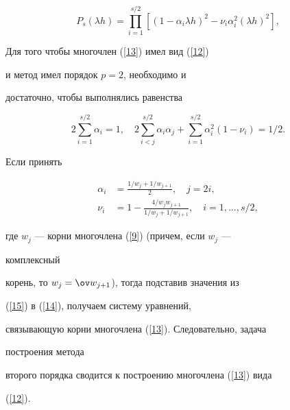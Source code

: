\begin{equation}


P_s(\lambda h)=\prod^{s/2}_{i=1}[(1-\alpha_{i}\lambda h)^2-


\nu_{i}\alpha^2_{i}(\lambda h)^2],


\label{13}


\end{equation}


Для того чтобы многочлен (\ref{13}) имел вид (\ref{12})


и метод имел порядок $p=2$, необходимо и


достаточно, чтобы выполнялись равенства


\begin{equation}


2\sum_{i=1}^{s/2}\alpha_i =1, \quad


2\sum_{i<j}^{s/2}\alpha_i\alpha_j+


\sum_{i=1}^{s/2}\alpha^2_i(1-\nu_i) = 1/2.


\label{14}


\end{equation}


Если принять


\begin{equation}


\begin{split}


\alpha_i & = \frac{1/w_j+1/w_{j+1}}{2}, \quad j=2i,\\


\nu_i &= 1-\frac{4/w_j w_{j+1}}{1/w_j +1/w_{j+1}},\quad i=1,\dotsc,s/2,


\end{split}


\label{15}


\end{equation}


где $w_j$ --- корни многочлена (\ref{9}) (причем, если $w_j$ ---


комплексный


корень, то $w_j =\ov w_{j+1}$), тогда подставив значения из


(\ref{15}) в (\ref{14}), получаем систему уравнений,


связывающую корни многочлена (\ref{13}). Следовательно, задача


построения метода


второго порядка сводится к построению многочлена (\ref{13}) вида


(\ref{12}).





